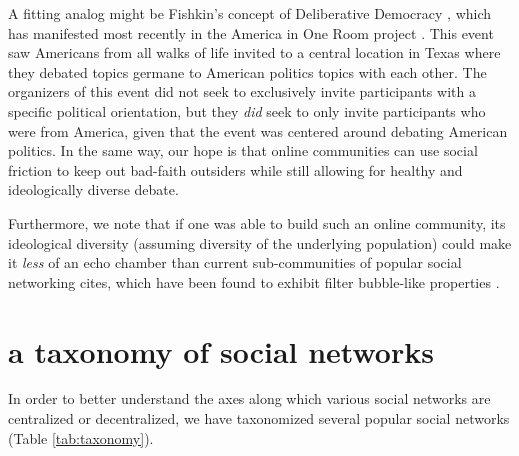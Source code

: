 \documentclass[sigconf,authordraft]{acmart}
\begin{document}
A fitting analog might be Fishkin's concept of Deliberative Democracy \cite{fishkin1991democracy}, which has manifested most recently in the America in One Room project \cite{AmericaInOneRoom}. This event saw Americans from all walks of life invited to a central location in Texas where they debated topics germane to American politics topics with each other. The organizers of this event did not seek to exclusively invite participants with a specific political orientation, but they {\itshape did} seek to only invite participants who were from America, given that the event was centered around debating American politics. In the same way, our hope is that online communities can use social friction to keep out bad-faith outsiders while still allowing for healthy and ideologically diverse debate.

Furthermore, we note that if one was able to build such an online community, its ideological diversity (assuming diversity of the underlying population) could make it {\itshape less} of an echo chamber than current sub-communities of popular social networking cites, which have been found to exhibit filter bubble-like properties \cite{pariser2011filter}.



\section{a taxonomy of social networks}

In order to better understand the axes along which various social networks are centralized or decentralized, we have taxonomized several popular social networks  (Table \ref{tab:taxonomy}).

\end{document}

